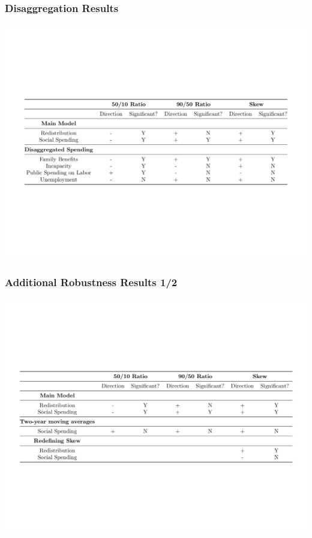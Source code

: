 \documentclass{beamer}
\begin{document}
\begin{frame}
\frametitle{Disaggregation Results}
\begin{center}
\includegraphics[scale=0.4]{robustnesscheck1}
\end{center}
\end{frame}

\begin{frame}
\frametitle{Additional Robustness Results 1/2}
\begin{center}
\includegraphics[scale=0.4]{robustnesscheck2}
\end{center}
\end{frame}
\end{document}
